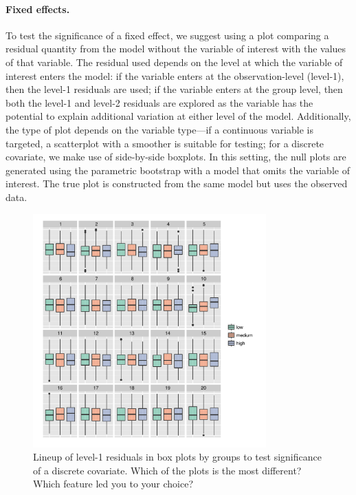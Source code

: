 \documentclass[12pt]{article} %
\newcommand{\hh}[1]{{\color{orange} #1}}
\newcommand{\alnote}[1]{\todo[inline,color=green!40]{#1}} %
\begin{document}
\paragraph{Fixed effects.} To test the significance of a fixed effect, we suggest using a plot comparing a residual quantity from the model without the variable of interest with the values of that variable. 
The residual used depends on the level at which the variable of interest enters the model: if the variable enters at the observation-level (level-1), then the level-1 residuals are used; if the variable enters at the group level, then both the level-1 and level-2 residuals are explored as the variable has the potential to explain additional variation at either level of the model.
Additionally, the type of plot depends on the variable type---if a continuous variable is targeted,  a scatterplot with a smoother is suitable for testing; for a discrete covariate, we make use of side-by-side boxplots. 
In this setting, the null plots are generated using the parametric bootstrap  with a model that omits the variable of interest. The true plot is constructed from the same model but uses the observed data. 

\begin{figure}[h]
	\centering
	\includegraphics[width=0.8\textwidth]{autism2-ordered-10.pdf}
	\caption{\label{fig:boxplot-ordered} \hh{Lineup of level-1 residuals in box plots  by groups to test significance of a discrete covariate.}
	Which of the plots is the most different? Which feature led you to your choice?} 
\end{figure}
\end{document}
